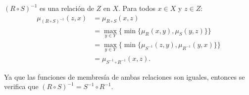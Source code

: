 
\((R\circ S)^{-1}\) es una relación de \(Z\) en \(X\).
Para todos \(x ∈ X\) y \(z ∈ Z\):
\begin{align*}
     μ_{(R\circ S)^{-1}}(z, x)
  &= μ_{R\circ S}(x, z) \\
  &= \max_{y ∈ Y}\bigl\{
       \min\{
         μ_R(x, y),
         μ_S(y, z)
       \}
     \bigr\} \\
  &= \max_{y ∈ Y}\bigl\{
       \min\{
         μ_{S^{-1}}(z, y),
         μ_{R^{-1}}(y, x)
       \}
     \bigr\} \\
  &= μ_{S^{-1}\circ R^{-1}}(x, z).
\end{align*}

Ya que las funciones de membresía de ambas relaciones son iguales,
entonces se verifica que \((R\circ S)^{-1} = S^{-1}\circ R^{-1}\).


